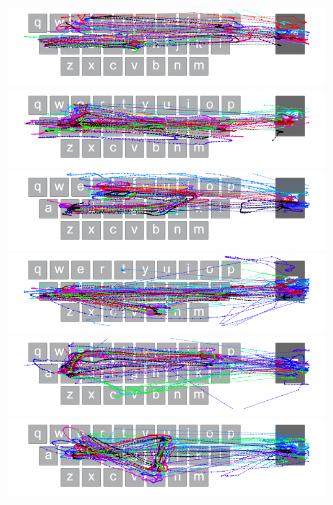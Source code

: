 \begin{figure}[t]
	\begin{minipage}[t]{8in}
	\hspace{-20pt}
	\begin{minipage}[t]{3.1in}
		\includegraphics[width=3.3in]{Figures/fig_gape_paths}
	\end{minipage}
	\begin{minipage}[t]{3in}
		\includegraphics[width=3.3in]{Figures/fig_hales_paths}
	\end{minipage}
	\end{minipage}
	
	\begin{minipage}[t]{8in}
	\hspace{-20pt}
	\begin{minipage}[t]{3.1in}
		\includegraphics[width=3.3in]{Figures/fig_shirt_paths}
	\end{minipage}
	\begin{minipage}[t]{3in}
		\includegraphics[width=3.3in]{Figures/fig_balls_paths}
	\end{minipage}
	\end{minipage}
	
	\begin{minipage}[t]{8in}
	\hspace{-20pt}
	\begin{minipage}[t]{3.1in}
		\includegraphics[width=3.3in]{Figures/fig_sores_paths}
	\end{minipage}
	\begin{minipage}[t]{3in}
		\includegraphics[width=3.3in]{Figures/fig_subbed_paths}
	\end{minipage}
	\end{minipage}
	

\end{figure}
